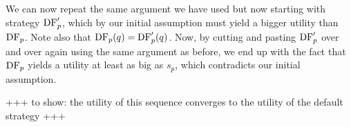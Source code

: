We can now repeat the same argument we have used but now starting with strategy $\text{\rm DF}'_p$, which by our initial assumption must yield 
a bigger utility than $\text{\rm DF}_p$. Note also that $\text{\rm DF}_p(q) = \text{\rm DF}_p'(q)$. 
Now, by cutting and pasting $\text{\rm DF}'_p$ over and over again using the same argument as before, we end up with the fact that $\text{\rm DF}_p$ yields 
a utility at least as big as $s_p$, which contradicts our initial assumption. 

+++ to show: the utility of this sequence converges to the utility of the default strategy +++








